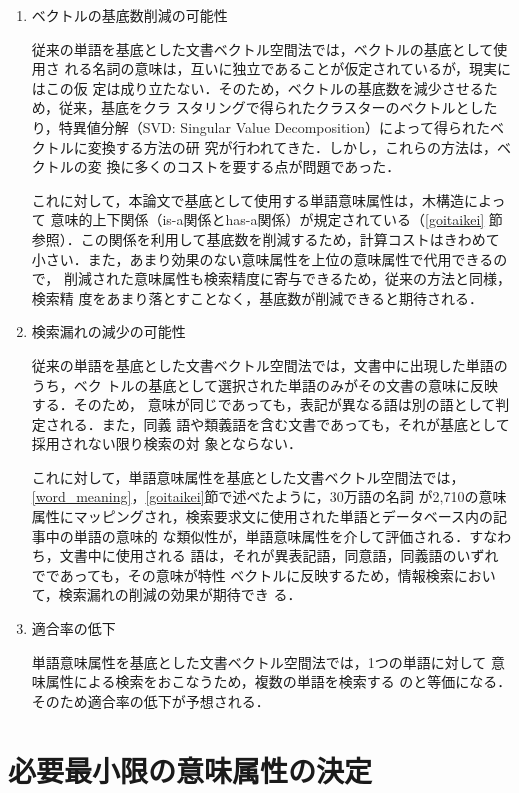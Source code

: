 \begin{enumerate}

\item ベクトルの基底数削減の可能性

従来の単語を基底とした文書ベクトル空間法では，ベクトルの基底として使用さ
れる名詞の意味は，互いに独立であることが仮定されているが，現実にはこの仮
定は成り立たない．そのため，ベクトルの基底数を減少させるため，従来，基底をクラ
スタリングで得られたクラスターのベクトルとしたり，特異値分解（SVD:
Singular Value Decomposition）によって得られたベクトルに変換する方法の研
究\cite{Deerwester}が行われてきた．しかし，これらの方法は，ベクトルの変
換に多くのコストを要する点が問題であった．

これに対して，本論文で基底として使用する単語意味属性は，木構造によって
意味的上下関係（is-a関係とhas-a関係）が規定されている（\ref{goitaikei}
節参照）．この関係を利用して基底数を削減するため，計算コストはきわめて
小さい．また，あまり効果のない意味属性を上位の意味属性で代用できるので，
削減された意味属性も検索精度に寄与できるため，従来の方法と同様，検索精
度をあまり落とすことなく，基底数が削減できると期待される．

\item 検索漏れの減少の可能性

従来の単語を基底とした文書ベクトル空間法では，文書中に出現した単語のうち，ベク
トルの基底として選択された単語のみがその文書の意味に反映する．そのため，
意味が同じであっても，表記が異なる語は別の語として判定される．また，同義
語や類義語を含む文書であっても，それが基底として採用されない限り検索の対
象とならない．

これに対して，単語意味属性を基底とした文書ベクトル空間法では，
\ref{word_meaning}，\ref{goitaikei}節で述べたように，30万語の名詞
が2,710の意味属性にマッピングされ，検索要求文に使用された単語とデータベース内の記事中の単語の意味的
な類似性が，単語意味属性を介して評価される．すなわち，文書中に使用される
語は，それが異表記語，同意語，同義語のいずれでであっても，その意味が特性
ベクトルに反映するため，情報検索において，検索漏れの削減の効果が期待でき
る．

\item 適合率の低下

単語意味属性を基底とした文書ベクトル空間法では，1つの単語に対して
意味属性による検索をおこなうため，複数の単語を検索する
のと等価になる．そのため適合率の低下が予想される．

\end{enumerate}

\section{必要最小限の意味属性の決定}

